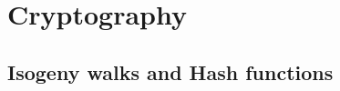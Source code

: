 \documentclass{beamer}
\renewcommand{\emph}[1]{{\usebeamercolor[fg]{structure}#1}}
\begin{document}

\section{Cryptography}





\subsection{Isogeny walks and Hash functions}

\end{document}
